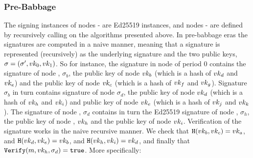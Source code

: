 \subsubsection{Pre-Babbage}
The signing instances of nodes - are Ed25519 instances, and nodes -
are defined by recursively calling on the algorithms presented above.
In pre-babbage eras the signatures are computed in a naive manner, meaning
that a signature is represented (recursively) as the underlying signature and the two public keys,
$\sigma = (\sigma', vk_0,vk_1)$.
So for instance, the signature in node  of period 0 contains the signature of node ,
$\sigma_b$, the public key of node  $vk_b$ (which is a hash of $vk_d$ and $vk_e$) and the public key
of node  $vk_c$ (which is a hash of $vk_f$ and $vk_g$). Signature $\sigma_b$ in turn contains
signature of node  $\sigma_d$, the public key of node  $vk_d$ (which is a hash of $vk_h$
and $vk_i$) and public key of node  $vk_e$ (which is a hash of $vk_j$ and $vk_k$). The signature of
node , $\sigma_d$ contains in turn the Ed25519 signature of node , $\sigma_h$, the public key
of node , $vk_h$ and the public key of node  $vk_i$. Verification of the signature works in
the naive recursive manner. We check that $\texttt{H}(vk_b, vk_c) = vk_a$, and $\texttt{H}(vk_d, vk_e) = vk_b$, and
$\texttt{H}(vk_h, vk_i) = vk_d$, and finally that $\texttt{Verify}(m, vk_h, \sigma_d) = \texttt{true}$.
More specifically:
